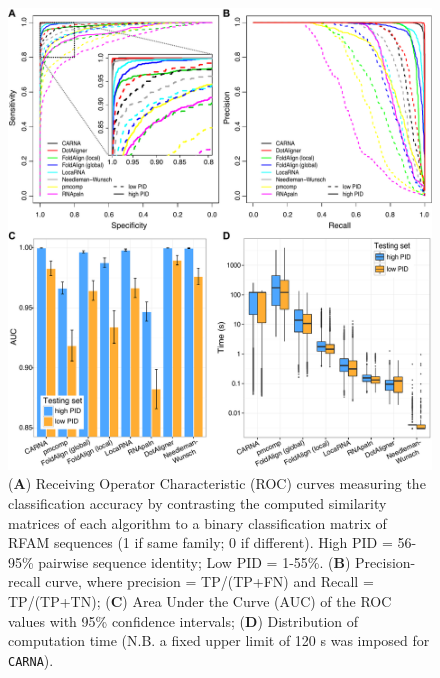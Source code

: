 \documentclass{bmcart}
\newcommand\carna{\texttt{CARNA}}
\begin{document}
\begin{backmatter}
\begin{figure}[h!]
 \includegraphics[width=\textwidth]{fig3}
 \caption {
 (\textbf{A}) Receiving Operator Characteristic (ROC) curves measuring the classification
 accuracy by contrasting the computed similarity matrices of each algorithm 
 to a binary classification matrix of RFAM  sequences (1 if same family; 
 0 if different). High PID =  56-95\% pairwise sequence identity; Low PID  = 1-55\%.
 (\textbf{B}) Precision-recall curve, {\color{red} where precision =  TP/(TP+FN) and Recall = TP/(TP+TN)};  
 (\textbf{C}) Area Under the Curve (AUC) of the ROC values with 95\% confidence intervals; 
 (\textbf{D}) Distribution of computation time (N.B. a fixed upper limit of 120 s was 
 imposed for \carna{}). }
\end{figure}



\end{backmatter}
\end{document}
